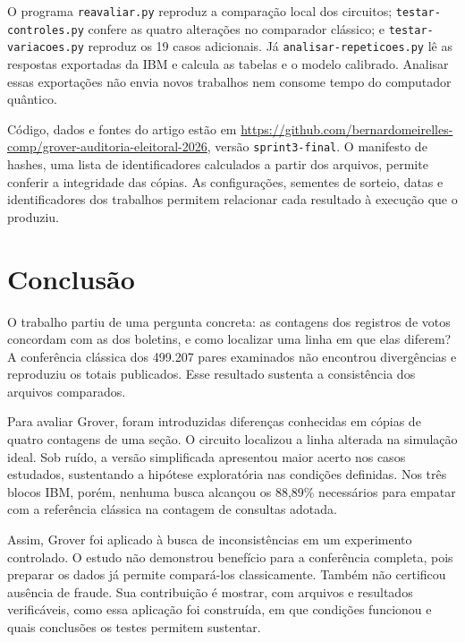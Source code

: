 O programa \texttt{reavaliar.py} reproduz a comparação local dos circuitos; \texttt{testar-controles.py} confere as quatro alterações no comparador clássico; e \texttt{testar-variacoes.py} reproduz os 19 casos adicionais. Já \texttt{analisar-repeticoes.py} lê as respostas exportadas da IBM e calcula as tabelas e o modelo calibrado. Analisar essas exportações não envia novos trabalhos nem consome tempo do computador quântico.

Código, dados e fontes do artigo estão em \url{https://github.com/bernardomeirelles-comp/grover-auditoria-eleitoral-2026}, versão \texttt{sprint3-final}. O manifesto de hashes, uma lista de identificadores calculados a partir dos arquivos, permite conferir a integridade das cópias. As configurações, sementes de sorteio, datas e identificadores dos trabalhos permitem relacionar cada resultado à execução que o produziu.

\section{Conclusão}
O trabalho partiu de uma pergunta concreta: as contagens dos registros de votos concordam com as dos boletins, e como localizar uma linha em que elas diferem? A conferência clássica dos 499.207 pares examinados não encontrou divergências e reproduziu os totais publicados. Esse resultado sustenta a consistência dos arquivos comparados.

Para avaliar Grover, foram introduzidas diferenças conhecidas em cópias de quatro contagens de uma seção. O circuito localizou a linha alterada na simulação ideal. Sob ruído, a versão simplificada apresentou maior acerto nos casos estudados, sustentando a hipótese exploratória nas condições definidas. Nos três blocos IBM, porém, nenhuma busca alcançou os 88,89\% necessários para empatar com a referência clássica na contagem de consultas adotada.

Assim, Grover foi aplicado à busca de inconsistências em um experimento controlado. O estudo não demonstrou benefício para a conferência completa, pois preparar os dados já permite compará-los classicamente. Também não certificou ausência de fraude. Sua contribuição é mostrar, com arquivos e resultados verificáveis, como essa aplicação foi construída, em que condições funcionou e quais conclusões os testes permitem sustentar.
